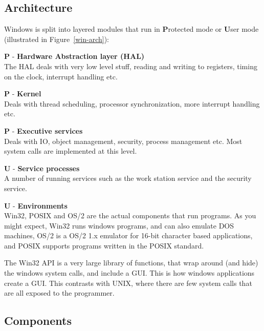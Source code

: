 \subsection{Architecture}

Windows is split into layered modules that run in \textbf{P}rotected mode or
\textbf{U}ser mode (illustrated in Figure~\ref{win-arch}):

\begin{description}
  \item \textbf{P} - \textbf{Hardware Abstraction layer (HAL)}\\
    The HAL deals with very low level stuff, reading and writing to registers,
    timing on the clock, interrupt handling etc.
  \item \textbf{P} - \textbf{Kernel}\\
    Deals with thread scheduling, processor synchronization, more interrupt
    handling etc.
  \item \textbf{P} - \textbf{Executive services}\\
    Deals with IO, object management, security, process management etc. Most
    system calls are implemented at this level.
  \item \textbf{U} - \textbf{Service processes}\\
    A number of running services such as the work station service and the
    security service.
  \item \textbf{U} - \textbf{Environments}\\
    Win32, POSIX and OS/2 are the actual components that run programs. As you
    might expect, Win32 runs windows programs, and can also emulate DOS
    machines, OS/2 is a OS/2 1.x emulator for 16-bit character based
    applications, and POSIX supports programs written in the POSIX standard.
\end{description}

The Win32 API is a very large library of functions, that wrap around (and hide)
the windows system calls, and include a GUI. This is how windows applications
create a GUI. This contrasts with UNIX, where there are few system calls that
are all exposed to the programmer.

\subsection{Components}

